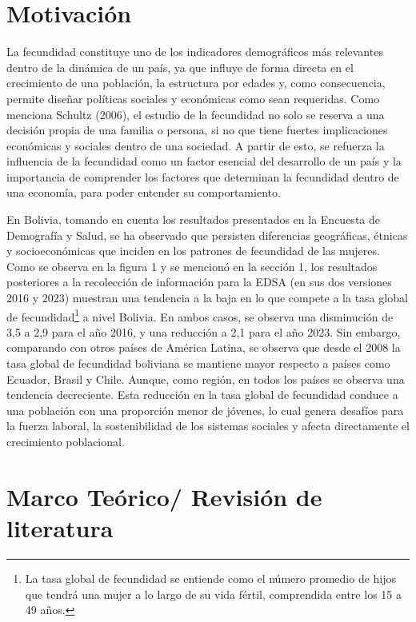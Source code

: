 \documentclass[Royal,times,sageh]{sagej}
\begin{document}
\section{Motivación}\label{motivaciuxf3n}

La fecundidad constituye uno de los indicadores demográficos más
relevantes dentro de la dinámica de un país, ya que influye de forma
directa en el crecimiento de una población, la estructura por edades y,
como consecuencia, permite diseñar políticas sociales y económicas como
sean requeridas. Como menciona Schultz (2006), el estudio de la
fecundidad no solo se reserva a una decisión propia de una familia o
persona, si no que tiene fuertes implicaciones económicas y sociales
dentro de una sociedad. A partir de esto, se refuerza la influencia de
la fecundidad como un factor esencial del desarrollo de un país y la
importancia de comprender los factores que determinan la fecundidad
dentro de una economía, para poder entender su comportamiento.

En Bolivia, tomando en cuenta los resultados presentados en la Encuesta
de Demografía y Salud, se ha observado que persisten diferencias
geográficas, étnicas y socioeconómicas que inciden en los patrones de
fecundidad de las mujeres. Como se observa en la figura 1 y se mencionó
en la sección 1, los resultados posteriores a la recolección de
información para la EDSA (en sus dos versiones 2016 y 2023) muestran una
tendencia a la baja en lo que compete a la tasa global de
fecundidad\footnote{La tasa global de fecundidad se entiende como el
  número promedio de hijos que tendrá una mujer a lo largo de su vida
  fértil, comprendida entre los 15 a 49 años.} a nivel Bolivia. En ambos
casos, se observa una disminución de 3,5 a 2,9 para el año 2016, y una
reducción a 2,1 para el año 2023. Sin embargo, comparando con otros
países de América Latina, se observa que desde el 2008 la tasa global de
fecundidad boliviana se mantiene mayor respecto a países como Ecuador,
Brasil y Chile. Aunque, como región, en todos los países se observa una
tendencia decreciente. Esta reducción en la tasa global de fecundidad
conduce a una población con una proporción menor de jóvenes, lo cual
genera desafíos para la fuerza laboral, la sostenibilidad de los
sistemas sociales y afecta directamente el crecimiento poblacional.

\section{Marco Teórico/ Revisión de
literatura}\label{marco-teuxf3rico-revisiuxf3n-de-literatura}
\end{document}
